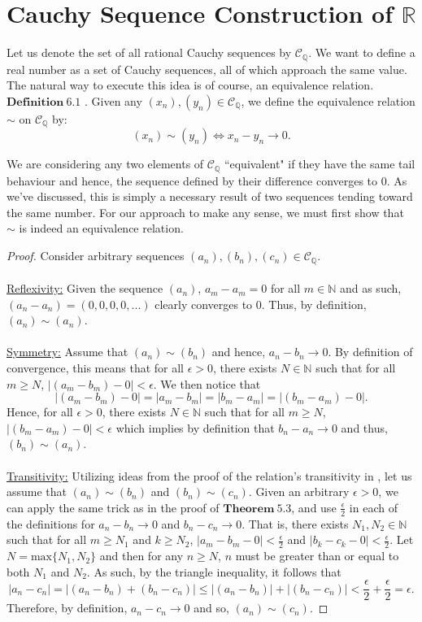 \documentclass[12pt]{article}
\theoremstyle{definition}
\theoremstyle{remark}
\begin{document}
\section{Cauchy Sequence Construction of $\mathbb{R}$}
 \noindent Let us denote the set of all rational Cauchy sequences by $\mathscr{C}_\mathbb{Q}$. We want to define a real number as a set of Cauchy sequences, all of which approach the same value. The natural way to execute this idea is of course, an equivalence relation.\\
 
 \noindent $\mathbf{Definition\ 6.1}$ \cite[pg.506]{new}.
        Given any $(x_n),(y_n)\in\mathscr{C}_\mathbb{Q}$, we define the equivalence relation $\sim$ on $\mathscr{C}_\mathbb{Q}$ by:
        $$(x_n)\sim (y_n)\iff x_n-y_n\rightarrow 0.$$

\noindent We are considering any two elements of $\mathscr{C}_\mathbb{Q}$ ``equivalent" if they have the same tail behaviour and hence, the sequence defined by their difference converges to $0$. As we've discussed, this is simply a necessary result of two sequences tending toward the same number. For our approach to make any sense, we must first show that $\sim$ is indeed an equivalence relation.
 	\begin{proof} Consider arbitrary sequences $(a_n),(b_n),(c_n)\in\mathscr{C}_\mathbb{Q}$.\\\\
\underline{Reflexivity:} Given the sequence $(a_n)$, $a_m-a_m=0$ for all $m\in\mathbb{N}$ and as such,\\ $(a_n-a_n)=(0,0,0,0,...)$ clearly converges to $0$. Thus, by definition, $(a_n)\sim(a_n)$.\\\\
\underline{Symmetry:} Assume that $(a_n)\sim (b_n)$ and hence, $a_n-b_n\rightarrow 0$. By definition of convergence, this means that for all $\epsilon>0$, there exists $N\in\mathbb{N}$ such that for all $m\geq N$, $|(a_{m}-b_{m})-0|<\epsilon$. We then notice that
$$|(a_{m}-b_{m})-0|=|a_{m}-b_{m}|=|b_{m}-a_{m}|=|(b_{m}-a_{m})-0|.$$
Hence, for all $\epsilon>0$, there exists $N\in\mathbb{N}$ such that for all $m\geq N$, $|(b_{m}-a_{m})-0|<\epsilon$ which implies by definition that $b_n-a_n\rightarrow 0$ and thus, $(b_n)\sim(a_n)$.\\\\
\underline{Transitivity:} Utilizing ideas from the proof of the relation's transitivity in \cite[p.507]{new}, let us assume that $(a_n)\sim(b_n)$ and $(b_n)\sim (c_n)$. Given an arbitrary $\epsilon >0$, we can apply the same trick as in the proof of $\mathbf{Theorem\ 5.3}$, and use $\frac{\epsilon}{2}$ in each of the definitions for $a_n-b_n\rightarrow 0$ and $b_n-c_n\rightarrow 0$. That is, there exists $N_1,N_2\in\mathbb{N}$ such that for all $m\geq N_1$ and $k\geq N_2$, $|a_{m}-b_{m}-0|<\frac{\epsilon}{2}$ and $|b_{k}-c_{k}-0|<\frac{\epsilon}{2}$. Let $N=\text{max}\{N_1,N_2\}$ and then for any $n\geq N$, $n$ must be greater than or equal to both $N_1$ and $N_2$. As such, by the triangle inequality, it follows that 
$$|a_n-c_n|=|(a_n-b_n)+(b_n-c_n)|\leq |(a_n-b_n)|+|(b_n-c_n)|<\frac{\epsilon}{2} + \frac{\epsilon}{2}=\epsilon.$$
Therefore, by definition, $a_n-c_n\rightarrow 0$ and so, $(a_n)\sim (c_n)$.
	\end{proof}
\end{document}

